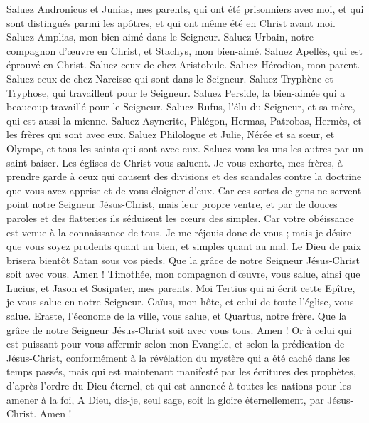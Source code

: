 \begin{multicols}{2}
Saluez Andronicus et Junias, mes parents, qui ont été prisonniers avec moi, et qui sont distingués parmi les apôtres, et qui ont même été en Christ avant moi.
Saluez Amplias, mon bien-aimé dans le Seigneur.
Saluez Urbain, notre compagnon d’œuvre en Christ, et Stachys, mon bien-aimé.
Saluez Apellès, qui est éprouvé en Christ. Saluez ceux de chez Aristobule.
Saluez Hérodion, mon parent. Saluez ceux de chez Narcisse qui sont dans le Seigneur.
Saluez Tryphène et Tryphose, qui travaillent pour le Seigneur. Saluez Perside, la bien-aimée qui a beaucoup travaillé pour le Seigneur.
Saluez Rufus, l’élu du Seigneur, et sa mère, qui est aussi la mienne.
Saluez Asyncrite, Phlégon, Hermas, Patrobas, Hermès, et les frères qui sont avec eux.
Saluez Philologue et Julie, Nérée et sa sœur, et Olympe, et tous les saints qui sont avec eux.
Saluez-vous les uns les autres par un saint baiser. Les églises de Christ vous saluent.
Je vous exhorte, mes frères, à prendre garde à ceux qui causent des divisions et des scandales contre la doctrine que vous avez apprise et de vous éloigner d'eux.
Car ces sortes de gens ne servent point notre Seigneur Jésus-Christ, mais leur propre ventre, et par de douces paroles et des flatteries ils séduisent les cœurs des simples.
Car votre obéissance est venue à la connaissance de tous. Je me réjouis donc de vous ; mais je désire que vous soyez prudents quant au bien, et simples quant au mal.
Le Dieu de paix brisera bientôt Satan sous vos pieds. Que la grâce de notre Seigneur Jésus-Christ soit avec vous. Amen !
Timothée, mon compagnon d’œuvre, vous salue, ainsi que Lucius, et Jason et Sosipater, mes parents.
Moi Tertius qui ai écrit cette Epître, je vous salue en notre Seigneur.
Gaïus, mon hôte, et celui de toute l'église, vous salue. Eraste, l’économe de la ville, vous salue, et Quartus, notre frère.
Que la grâce de notre Seigneur Jésus-Christ soit avec vous tous. Amen !
Or à celui qui est puissant pour vous affermir selon mon Evangile, et selon la prédication de Jésus-Christ, conformément à la révélation du mystère qui a été caché dans les temps passés,
mais qui est maintenant manifesté par les écritures des prophètes, d’après l’ordre du Dieu éternel, et qui est annoncé à toutes les nations pour les amener à la foi,
A Dieu, dis-je, seul sage, soit la gloire éternellement, par Jésus-Christ. Amen !
\PPE{}
\end{multicols}
